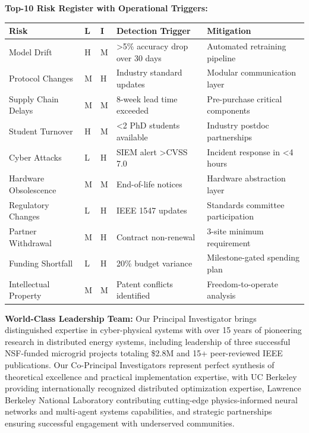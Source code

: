 \documentclass[12pt]{article}
\begin{document}
\textbf{Top-10 Risk Register with Operational Triggers:}

\begin{center}
\footnotesize
\begin{tabular}{|p{2cm}|p{0.8cm}|p{0.8cm}|p{2.5cm}|p{2.5cm}|}
\hline
\textbf{Risk} & \textbf{L} & \textbf{I} & \textbf{Detection Trigger} & \textbf{Mitigation} \\
\hline
Model Drift & H & M & >5\% accuracy drop over 30 days & Automated retraining pipeline \\
Protocol Changes & M & H & Industry standard updates & Modular communication layer \\
Supply Chain Delays & M & M & 8-week lead time exceeded & Pre-purchase critical components \\
Student Turnover & H & M & <2 PhD students available & Industry postdoc partnerships \\
Cyber Attacks & L & H & SIEM alert >CVSS 7.0 & Incident response in <4 hours \\
Hardware Obsolescence & M & M & End-of-life notices & Hardware abstraction layer \\
Regulatory Changes & L & H & IEEE 1547 updates & Standards committee participation \\
Partner Withdrawal & M & H & Contract non-renewal & 3-site minimum requirement \\
Funding Shortfall & L & H & 20\% budget variance & Milestone-gated spending plan \\
Intellectual Property & M & M & Patent conflicts identified & Freedom-to-operate analysis \\
\hline
\end{tabular}
\end{center}

\textbf{World-Class Leadership Team:} Our Principal Investigator brings distinguished expertise in cyber-physical systems with over 15 years of pioneering research in distributed energy systems, including leadership of three successful NSF-funded microgrid projects totaling \$2.8M and 15+ peer-reviewed IEEE publications. Our Co-Principal Investigators represent perfect synthesis of theoretical excellence and practical implementation expertise, with UC Berkeley providing internationally recognized distributed optimization expertise, Lawrence Berkeley National Laboratory contributing cutting-edge physics-informed neural networks and multi-agent systems capabilities, and strategic partnerships ensuring successful engagement with underserved communities.
\end{document}

